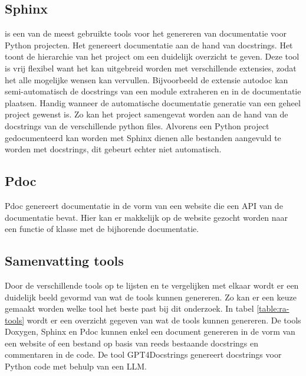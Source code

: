 \subsection{Sphinx}
\textcite{Sphinx2023} is een van de meest gebruikte tools voor het genereren van documentatie voor Python projecten.
Het genereert documentatie aan de hand van docstrings. Het toont de hierarchie van het project om een duidelijk overzicht te geven.
Deze tool is vrij flexibel want het kan uitgebreid worden met verschillende extensies, zodat het alle mogelijke wensen kan vervullen.
Bijvoorbeeld de extensie autodoc kan semi-automatisch de docstrings van een module extraheren en in de documentatie plaatsen. 
Handig wanneer de automatische documentatie generatie van een geheel project gewenst is. Zo kan het project samengevat worden aan de hand van de docstrings van de verschillende python files. 
Alvorens een Python project gedocumenteerd kan worden met Sphinx dienen alle bestanden aangevuld te worden met docstrings, dit gebeurt echter niet automatisch.

\subsection{Pdoc}
Pdoc \autocite{GallantHils2023} genereert documentatie in de vorm van een website die een API van de documentatie bevat. 
Hier kan er makkelijk op de website gezocht worden naar een functie of klasse met de bijhorende documentatie.

\begin{table}[h!]
\centering
{}
\caption{Vergelijking documentatie tools}
\label{table:vgl-tools}
\end{table}

\subsection{Samenvatting tools}
\label{sec:samenvatting-tools}
Door de verschillende tools op te lijsten en te vergelijken met elkaar wordt er een duidelijk beeld gevormd van wat de tools kunnen genereren.
Zo kan er een keuze gemaakt worden welke tool het beste past bij dit onderzoek.
In tabel \ref{table:ra-tools} wordt er een overzicht gegeven van wat de tools kunnen genereren.
De tools Doxygen, Sphinx en Pdoc kunnen enkel een document genereren in de vorm van een website of een bestand op basis van reeds bestaande docstrings en commentaren in de code.
De tool GPT4Docstrings genereert docstrings voor Python code met behulp van een LLM.

